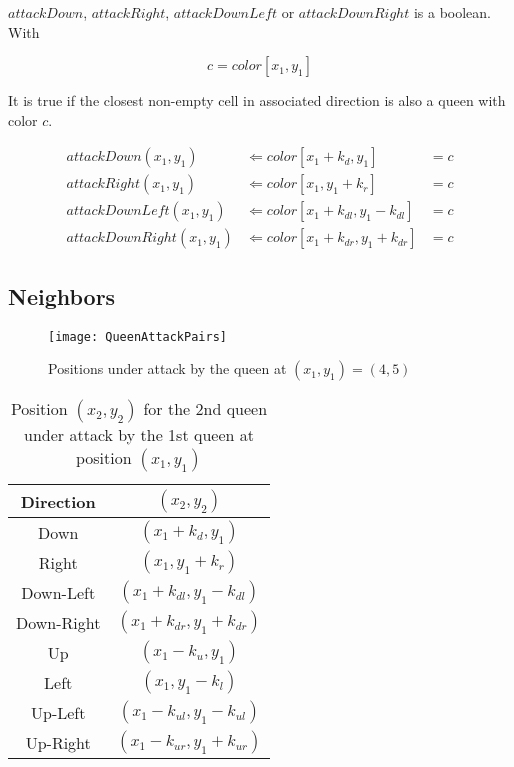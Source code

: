 \documentclass{article} %
\begin{document}
  $attackDown$, $attackRight$, $attackDownLeft$ or $attackDownRight$ is a boolean. With
  
  \[ c = color[x_1, y_1 ]\]
  
  It is true if the closest non-empty cell in associated direction is also a queen with color $c$. 

  \begin{align*}
    attackDown(x_1, y_1)      & \Leftarrow color[x_1+k_d, y_1]           &= c \\
    attackRight(x_1, y_1)     & \Leftarrow color[x_1, y_1+k_r]           &= c \\
    attackDownLeft(x_1, y_1)  & \Leftarrow color[x_1+k_{dl}, y_1-k_{dl}] &= c \\
    attackDownRight(x_1, y_1) & \Leftarrow color[x_1+k_{dr}, y_1+k_{dr}] &= c
  \end{align*}

  \subsection{Neighbors}

  \begin{figure}[h]
    \centering
    \texttt{[image: QueenAttackPairs]}
    \caption{Positions under attack by the queen at $(x_1, y_1) = (4, 5)$}
    \label{fig:QueenAttackPairs}
  \end{figure}

  \begin{table}
    \centering
    \begin{tabular}{|c|c|}
      \hline
      \textbf{Direction} & $(x_2, y_2)$ \\
      \hline
      Down & $(x_1+k_d, y_1)$\\
      \hline
      Right & $(x_1, y_1+k_r)$\\
      \hline
      Down-Left & $(x_1+k_{dl}, y_1-k_{dl})$\\
      \hline
      Down-Right & $(x_1+k_{dr}, y_1+k_{dr})$ \\
      \hline
      Up & $(x_1-k_u, y_1)$\\
      \hline
      Left & $(x_1, y_1-k_l)$\\
      \hline
      Up-Left & $(x_1-k_{ul}, y_1-k_{ul})$\\
      \hline
      Up-Right & $(x_1-k_{ur}, y_1+k_{ur})$ \\
      \hline
    \end{tabular}
    \caption{Position $(x_2, y_2)$ for the 2nd queen under attack by the 1st queen at position $(x_1, y_1)$}
    \label{tab:QueenAttackDirections}
  \end{table}
\end{document}
